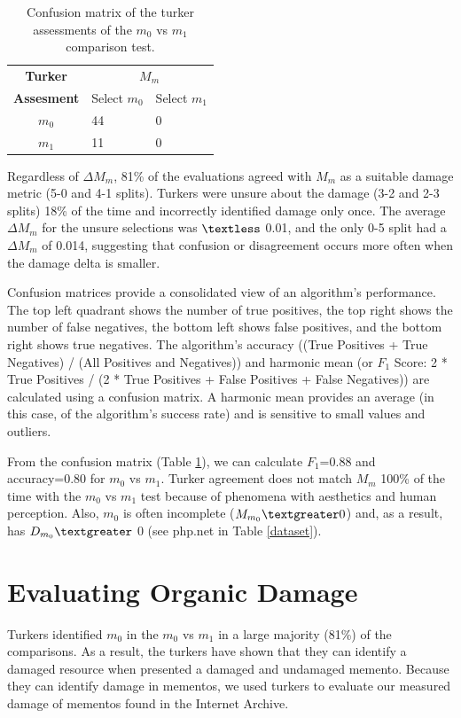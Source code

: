 \begin{table}
\centering\begin{tabular}{cll}
\textbf{Turker} & \multicolumn{2}{c}{ \textbf{ $M_{m}$}}                           \\
\textbf{Assesment}                  &          Select $m_{0}$             &           Select $m_{1}$             \\ \cline{2-3} 
       $m_{0}$           & \multicolumn{1}{|l}{44} & \multicolumn{1}{|l|}{0} \\ \cline{2-3} 
       $m_{1}$           & \multicolumn{1}{|l}{11} & \multicolumn{1}{|l|}{0} \\ \cline{2-3} 
\end{tabular}
 \caption{Confusion matrix of the turker assessments of the $m_0$ vs $m_1$ comparison test.}
  \label{m0cm}
\end{table}


Regardless of {$\Delta M_m$}, 81\% of the evaluations agreed with $M_m$ as a suitable damage metric (5-0 and 4-1 splits). Turkers were unsure about the damage (3-2 and 2-3 splits) 18\% of the time and incorrectly identified damage only once. The average {$\Delta M_m$} for the unsure selections was $\textless$ 0.01, and the only 0-5 split had a {$\Delta M_m$} of 0.014, suggesting that confusion or disagreement occurs more often when the damage delta is smaller. 

Confusion matrices provide a consolidated view of an algorithm's performance. The top left quadrant shows the number of true positives, the top right shows the number of false negatives, the bottom left shows false positives, and the bottom right shows true negatives. The algorithm's accuracy ((True Positives + True Negatives) / (All Positives and Negatives)) and harmonic mean (or $F_1$ Score: 2 * True Positives / (2 * True Positives + False Positives + False Negatives)) are calculated using a confusion  matrix. A harmonic mean provides an average (in this case, of the algorithm's success rate) and is sensitive to small values and outliers.  

From the confusion matrix (Table \ref{m0cm}), we can calculate $F_1$=0.88 and accuracy=0.80 for $m_0$ vs $m_1$. Turker agreement does not match $M_m$ 100\% of the time with the $m_0$ vs $m_1$ test because of phenomena with aesthetics and human perception. Also, $m_0$ is often incomplete ($M_{m_0} \textgreater 0$) and, as a result, has $D_{m_0} \textgreater$ 0 (see php.net in Table \ref{dataset}).

\section{Evaluating Organic Damage}
\label{turkActual}
Turkers identified $m_0$ in the $m_0$ vs $m_1$ in a large majority (81\%) of the comparisons. As a result, the turkers have shown that they can identify a damaged resource when presented a damaged and undamaged memento. Because they can identify damage in mementos, we used turkers to evaluate our measured damage of mementos found in the Internet Archive. 

